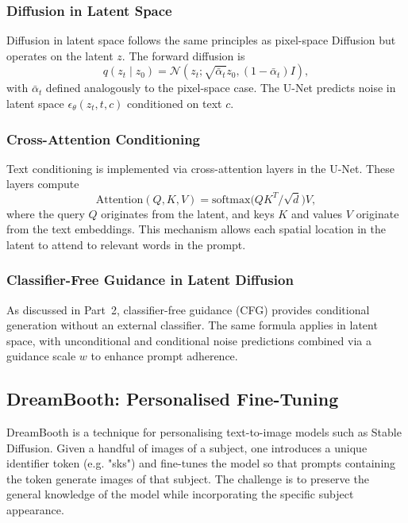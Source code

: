 \subsubsection{Diffusion in Latent Space}

Diffusion in latent space follows the same principles as pixel-space
Diffusion but operates on the latent $z$.  The forward diffusion is
\begin{equation}
  q(z_t \mid z_0) = \mathcal{N}(z_t; \sqrt{\bar{\alpha}_t} z_0, (1-\bar{\alpha}_t)I),
\end{equation}
with $\bar{\alpha}_t$ defined analogously to the pixel-space case.
The U-Net predicts noise in latent space
$\epsilon_\theta(z_t,t,c)$ conditioned on text $c$.

\subsubsection{Cross-Attention Conditioning}

Text conditioning is implemented via cross-attention layers in the
U-Net.  These layers compute
\begin{equation}
  \mathrm{Attention}(Q,K,V) = \mathrm{softmax}\bigl(QK^T/\sqrt{d}\bigr)
  V,
\end{equation}
where the query $Q$ originates from the latent, and keys $K$ and
values $V$ originate from the text embeddings.  This mechanism allows
each spatial location in the latent to attend to relevant words in
the prompt.

\subsubsection{Classifier-Free Guidance in Latent Diffusion}

As discussed in Part~2, classifier-free guidance (CFG) provides
conditional generation without an external classifier.  The same
formula applies in latent space, with unconditional and conditional
noise predictions combined via a guidance scale $w$ to enhance
prompt adherence.

\subsection{DreamBooth: Personalised Fine-Tuning}

DreamBooth is a technique for personalising text-to-image models such
as Stable Diffusion.  Given a handful of images of a subject, one
introduces a unique identifier token (e.g. "sks") and fine-tunes the
model so that prompts containing the token generate images of that
subject.  The challenge is to preserve the general knowledge of the
model while incorporating the specific subject appearance.

